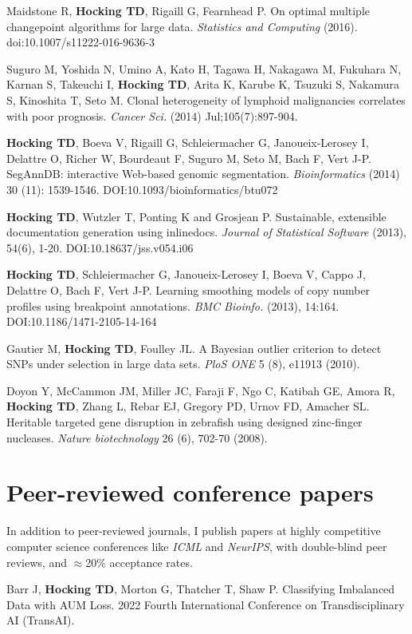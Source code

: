 \documentclass[margin,line]{res}
\begin{document}
\begin{resume}
Maidstone R, {\bf Hocking TD}, Rigaill G, Fearnhead P. On optimal
multiple changepoint algorithms for large data. {\it Statistics and
Computing} (2016). doi:10.1007/s11222-016-9636-3 

Suguro M, Yoshida N, Umino A, Kato H, Tagawa H, Nakagawa M, Fukuhara
N, Karnan S, Takeuchi I, {\bf Hocking TD}, Arita K, Karube K, Tsuzuki
S, Nakamura S, Kinoshita T, Seto M. Clonal heterogeneity of lymphoid
malignancies correlates with poor prognosis. {\it Cancer Sci.} (2014)
Jul;105(7):897-904.

{\bf Hocking TD}, Boeva V, Rigaill G, Schleiermacher G,
Janoueix-Lerosey I, Delattre O, Richer W, Bourdeaut F, Suguro M, Seto
M, Bach F, Vert J-P. SegAnnDB: interactive Web-based genomic
segmentation. {\it Bioinformatics} (2014) 30 (11):
1539-1546. DOI:10.1093/bioinformatics/btu072

{\bf Hocking TD}, Wutzler T, Ponting K and Grosjean P. Sustainable,
extensible documentation generation using inlinedocs. {\it Journal of
Statistical Software} (2013), 54(6), 1-20. DOI:10.18637/jss.v054.i06

{\bf Hocking TD}, Schleiermacher G, Janoueix-Lerosey I, Boeva V, Cappo
J, Delattre O, Bach F, Vert J-P. Learning smoothing models of copy
number profiles using breakpoint annotations. {\it BMC Bioinfo.} (2013),
14:164. DOI:10.1186/1471-2105-14-164

Gautier M, {\bf Hocking TD}, Foulley JL. A Bayesian outlier criterion
to detect SNPs under selection in large data sets. {\it PloS ONE} 5
(8), e11913 (2010).

Doyon Y, McCammon JM, Miller JC, Faraji F, Ngo C, Katibah GE, Amora R,
{\bf Hocking TD}, Zhang L, Rebar EJ, Gregory PD, Urnov FD, Amacher
SL. Heritable targeted gene disruption in zebrafish using designed
zinc-finger nucleases. {\it Nature biotechnology} 26 (6), 702-70
(2008).

\section{\sc Peer-reviewed conference papers}

In addition to peer-reviewed journals, I publish papers at highly
competitive computer science conferences like {\it ICML} and {\it
  NeurIPS}, with double-blind peer reviews, and $\approx$20\%
acceptance rates.

Barr J, {\bf Hocking TD}, Morton G, Thatcher T, Shaw P. Classifying
Imbalanced Data with AUM Loss. 2022 Fourth International Conference on
Transdisciplinary AI (TransAI). 


\end{resume}
\end{document}
